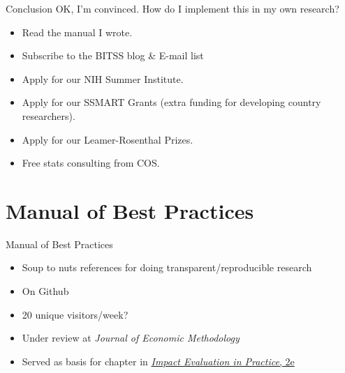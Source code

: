 \documentclass{beamer}
\begin{document}
\begin{frame}{Conclusion}
OK, I'm convinced. How do I implement this in my own research?
\begin{itemize}[<.->]
\item Read the manual I wrote.\href{https://github.com/garretchristensen/BestPracticesManual}{}
\item Subscribe to the BITSS blog \& E-mail list \href{https://bitss.org/blog}{}
\item Apply for our NIH Summer Institute. \href{http://www.bitss.org/events/summer-institute/}{}
\item Apply for our SSMART Grants (extra funding for developing country researchers). \href{http://www.bitss.org/ssmart-grants/}{}
\item Apply for our Leamer-Rosenthal Prizes. \href{http://www.bitss.org/lr-prizes/}{}
\item Free stats consulting from COS. \href{https://cos.io/stats_consulting/}{}
\end{itemize}
\end{frame}


\section{Manual of Best Practices}
\begin{frame}{Manual of Best Practices}
\begin{itemize}
\item Soup to nuts references for doing transparent/reproducible research
\item On Github \href{http://www.github.com/garretchristensen/bestpracticesmanual}{}
\item 20 unique visitors/week?
\item Under review at \textit{Journal of Economic Methodology}
\item Served as basis for chapter in \href{https://openknowledge.worldbank.org/bitstream/handle/10986/25030/9781464807794.pdf?sequence=2}{\textit{Impact Evaluation in Practice}, 2e} 
\end{itemize}
\end{frame}
\end{document}
